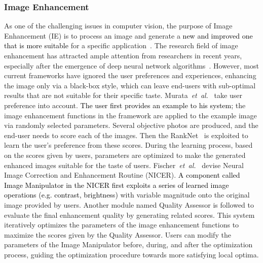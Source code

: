 \documentclass{article}
\newcommand\etal{\emph{et~al.}}
\newcommand{\ZJH}[1]{\textcolor{black}{#1}}
\begin{document}
\subsubsection{Image Enhancement}
As one of the challenging issues in computer vision, the purpose of Image Enhancement (IE) is to process an image and generate a \ZJH{new and improved one that is more suitable} for a specific application~\cite{shukla2017review}. The research field of image enhancement has attracted ample attention from researchers in recent years, especially after the emergence of deep neural network algorithms~\cite{fu2018image}. However, most current frameworks have ignored the user preferences and experiences, enhancing the image only via a black-box style, which can leave end-users with sub-optimal results that are not suitable for their specific taste. Murata~\etal~\cite{murata2019automatic} take user preference into account. \ZJH{The user first provides an example to his system;} the image enhancement functions in the framework are applied to the example image via randomly selected parameters. Several objective photos are produced, and the end-user needs to score each of the images. Then the RankNet~\cite{burges2005learning} is exploited to learn the user's preference from these scores.
During the learning process, based on the scores given by users, parameters are optimized to make the generated enhanced images suitable for the taste of users. Fischer~\etal~\cite{fischer2020nicer} devise Neural Image Correction and Enhancement Routine (NICER). \ZJH{A component called Image Manipulator in the NICER first exploits a series of learned image operations (e.g. contrast, brightness)} with variable magnitude onto the original image provided by users. Another module named Quality Assessor is followed to evaluate the final enhancement quality by generating related scores. This system iteratively optimizes the parameters of the image enhancement functions to maximize the scores given by the Quality Assessor. Users can modify the parameters of the Image Manipulator before, during, and after the optimization process, guiding the optimization procedure towards more satisfying local optima.
\end{document}
